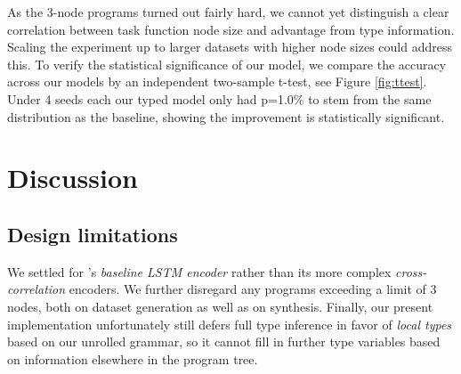 \documentclass{article} %
\begin{document}

As the 3-node programs turned out fairly hard,
we cannot yet distinguish a clear correlation between
task function node size and advantage from type information.
Scaling the experiment up to larger datasets with higher node sizes could address this.
%
To verify the statistical significance of our model,
we compare the accuracy across our models by an independent two-sample t-test,
see Figure \ref{fig:ttest}.
Under 4 seeds each our typed model only had p=1.0\%
to stem from the same distribution as the baseline,
showing the improvement is statistically significant.


\vspace{-10pt}
\section{Discussion} %
\vspace{-10pt}

\subsection{Design limitations}
\vspace{-5pt}

    We settled for \citet{nsps}'s \emph{baseline LSTM encoder} rather than its more complex \emph{cross-correlation} encoders.
    We further disregard any programs exceeding a limit of 3 nodes, both on dataset generation as well as on synthesis.
    Finally, our present implementation unfortunately still defers full type inference in favor of \emph{local types} based on our unrolled grammar,
    so it cannot fill in further type variables based on information elsewhere in the program tree.
\end{document}
